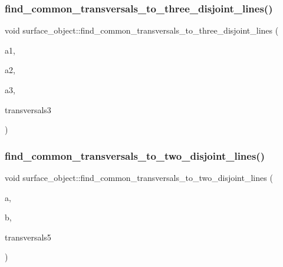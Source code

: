 \subsubsection{\texorpdfstring{find\+\_\+common\+\_\+transversals\+\_\+to\+\_\+three\+\_\+disjoint\+\_\+lines()}{find\_common\_transversals\_to\_three\_disjoint\_lines()}}
{\footnotesize\ttfamily void surface\+\_\+object\+::find\+\_\+common\+\_\+transversals\+\_\+to\+\_\+three\+\_\+disjoint\+\_\+lines (\begin{DoxyParamCaption}\item[{\mbox{\hyperlink{galois_8h_a09fddde158a3a20bd2dcadb609de11dc}{I\+NT}}}]{a1,  }\item[{\mbox{\hyperlink{galois_8h_a09fddde158a3a20bd2dcadb609de11dc}{I\+NT}}}]{a2,  }\item[{\mbox{\hyperlink{galois_8h_a09fddde158a3a20bd2dcadb609de11dc}{I\+NT}}}]{a3,  }\item[{\mbox{\hyperlink{galois_8h_a09fddde158a3a20bd2dcadb609de11dc}{I\+NT}} $\ast$}]{transversals3 }\end{DoxyParamCaption})}

\mbox{\label{classsurface__object_a04e29003af9e593bf04ccbe9e16e790e}} 
\subsubsection{\texorpdfstring{find\+\_\+common\+\_\+transversals\+\_\+to\+\_\+two\+\_\+disjoint\+\_\+lines()}{find\_common\_transversals\_to\_two\_disjoint\_lines()}}
{\footnotesize\ttfamily void surface\+\_\+object\+::find\+\_\+common\+\_\+transversals\+\_\+to\+\_\+two\+\_\+disjoint\+\_\+lines (\begin{DoxyParamCaption}\item[{\mbox{\hyperlink{galois_8h_a09fddde158a3a20bd2dcadb609de11dc}{I\+NT}}}]{a,  }\item[{\mbox{\hyperlink{galois_8h_a09fddde158a3a20bd2dcadb609de11dc}{I\+NT}}}]{b,  }\item[{\mbox{\hyperlink{galois_8h_a09fddde158a3a20bd2dcadb609de11dc}{I\+NT}} $\ast$}]{transversals5 }\end{DoxyParamCaption})}

